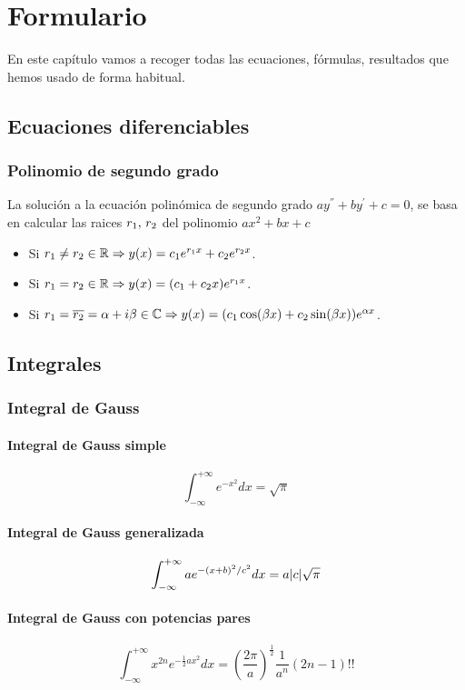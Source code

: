\chapter{Formulario}\label{ch:formulario}
En este capítulo vamos a recoger todas las ecuaciones, fórmulas, resultados que hemos usado de forma habitual.

\section{Ecuaciones diferenciables}\label{sec:ecuaciones-diferenciables}
\subsection{Polinomio de segundo grado}\label{subsec:polinomio-de-segundo-grado}
La solución a la ecuación polinómica de segundo grado $ay^{''}+by^{'}+c=0$, se basa en calcular las raices $r_1,\thinspace r_2$ del polinomio
$ax^2+bx+c$
\begin{itemize}
    \item Si $r_1\neq r_2\in\mathbb{R}\Rightarrow y(x)=c_{1}e^{r_{1}x}+c_{2}e^{r_{2}x}$.
    \item Si $r_1= r_2\in\mathbb{R}\Rightarrow y(x)=(c_{1}+c_{2}x)e^{r_{1}x}$.
    \item Si $r_1= \overline{r_2}=\alpha+i\beta\in\mathbb{C}\Rightarrow y(x)=(c_{1}\cos(\beta x)+c_{2}\sin(\beta x))e^{\alpha x}$.
\end{itemize}

\section{Integrales}\label{sec:integrales}
\subsection{Integral de Gauss}\label{subsec:integral-de-gauss}
\subsubsection*{Integral de Gauss simple}
\begin{equation}
    \label{eq:integral-gauss}
    \int_{-\infty}^{+\infty} e^{-x^{2}}dx =\sqrt{\pi}
\end{equation}

\subsubsection*{Integral de Gauss generalizada}
\begin{equation}
    \label{eq:integral-gauss-generalizada}
    \int_{-\infty}^{+\infty} ae^{-(x+b)^{2}/c^2}dx =a\lvert c\rvert\sqrt{\pi}
\end{equation}

\subsubsection*{Integral de Gauss con potencias pares}
\begin{equation}
    \label{eq:integral-gauss-generalizada-potencias-pares}
    \int_{-\infty}^{+\infty} x^{2n}e^{-\frac{1}{2}ax^{2}}dx =\left(\frac{2\pi}{a}\right)^{\frac{1}{2}}\frac{1}{a^n}(2n-1)!!
\end{equation}
